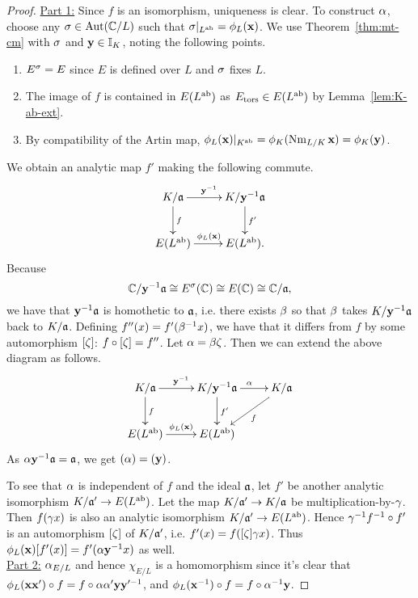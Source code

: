 \begin{proof}
\noindent\underline{Part 1:} 
Since $f$ is an isomorphism, uniqueness is clear. To construct $\alpha$, choose any $\sigma\in \operatorname{Aut}(\mathbb{C}/L)$ such that $\sigma|_{L^{\text{ab}}}=\phi_L(\mathbf{x})$. We use Theorem~\ref{thm:mt-cm} with $\sigma$ and $\mathbf y\in \mathbb{I}_K$, noting the following points.
\begin{enumerate}
\item
$E^{\sigma}=E$ since $E$ is defined over $L$ and $\sigma$ fixes $L$.
\item
The image of $f$ is contained in $E(L^{\text{ab}})$ as $E_{\text{tors}}\in E(L^{\text{ab}})$ by Lemma~\ref{lem:K-ab-ext}.
\item
By compatibility of the Artin map,
$\phi_L(\mathbf{x})|_{K^{\text{ab}}}=\phi_K(\operatorname{Nm}_{L/K}\mathbf x)=\phi_K(\mathbf y)$.
\end{enumerate}
We obtain an analytic map $f'$ making the following commute.
\[
\xymatrix{
K/\ma \ar[r]^{\mathbf y^{-1}}\ar[d]^f & K/\mathbf y^{-1}\ma\ar@{->}[d]^{f'}\\
E(L\abe)\ar[r]^{\phi_L(\mx)} & E(L\abe).
}
\]
Because
\[
\mathbb{C}/\mathbf y^{-1} \mathfrak{a}\cong E^{\sigma}(\mathbb{C})\cong E(\mathbb{C})\cong \mathbb{C}/\mathfrak{a},
\]
we have that $\mathbf y^{-1}\mathfrak{a}$ is homothetic to $\mathfrak{a}$, i.e. there exists $\beta$ so that $\beta$ takes $K/\mathbf y^{-1}\mathfrak{a}$ back to $K/\mathfrak{a}$. Defining $f''(x)=f'(\beta^{-1}x)$, we have that it differs from $f$ by some automorphism $[\zeta]$: $f\circ [\zeta]=f''$. Let $\alpha=\beta\zeta$. Then we can extend the above diagram as follows.
\[
\xymatrix{
K/\ma \ar[r]^{\mathbf y^{-1}}\ar[d]^f & K/\mathbf y^{-1}\ma\ar@{->}[d]^{f'}\ar[r]^{\al}  & K/\ma \ar[ld]^{f}\\
E(L\abe)\ar[r]^{\phi_L(\mx)} & E(L\abe) &
}
\]
As $\alpha\mathbf y^{-1}\mathfrak{a}=\mathfrak{a}$, we get $(\alpha)=(\mathbf y)$.

To see that $\alpha$ is independent of $f$ and the ideal $\mathfrak{a}$, let $f'$ be another analytic isomorphism $K/\mathfrak{a}'\to E(L^{\text{ab}})$. Let the map $K/\mathfrak{a}'\to K/\mathfrak{a}$ be multiplication-by-$\gamma$. Then $f(\gamma x)$ is also an analytic isomorphism $K/\mathfrak{a}'\to E(L^{\text{ab}})$. Hence $\gamma^{-1} f^{-1}\circ f'$ is an automorphism $[\zeta]$ of $K/\mathfrak{a}'$, i.e. $f'(x)=f([\zeta]\gamma x)$. Thus $\phi_L(\mathbf x)[f'(x)]=f'(\alpha \mathbf y^{-1} x)$ as well.\\

\noindent\underline{Part 2:} 
$\alpha_{E/L}$ and hence $\chi_{E/L}$ is a homomorphism since it's clear that $\phi_L(\mathbf x\mathbf x')\circ f=f\circ \alpha\alpha'\mathbf y\mathbf y'^{-1}$, and $\phi_L(\mathbf x^{-1})\circ f=f\circ \alpha^{-1}\mathbf y$.


\end{proof}
